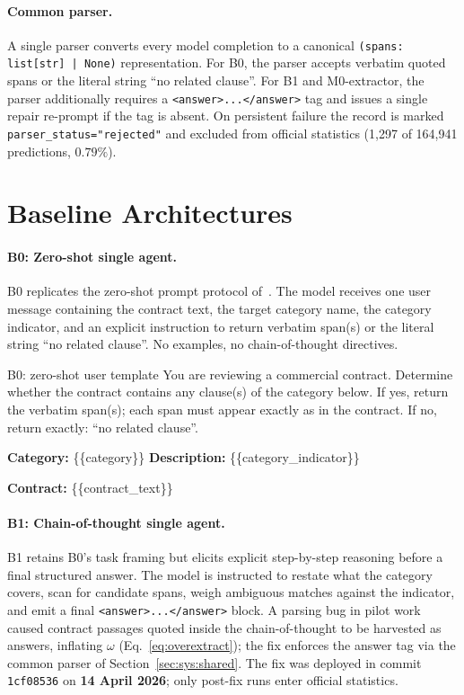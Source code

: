 \paragraph{Common parser.}
A single parser converts every model completion to a canonical
\texttt{(spans: list[str]~|~None)} representation. For B0, the parser accepts
verbatim quoted spans or the literal string ``no related clause''. For B1 and
M0-extractor, the parser additionally requires a \texttt{<answer>...</answer>} tag
and issues a single repair re-prompt if the tag is absent. On persistent failure the
record is marked \texttt{parser\_status="rejected"} and excluded from official
statistics (1{,}297 of 164{,}941 predictions, $0.79\%$).

\section{Baseline Architectures}\label{sec:sys:baselines}

\paragraph{B0: Zero-shot single agent.}
B0 replicates the zero-shot prompt protocol of~\cite{liu2025contracteval}. The model
receives one user message containing the contract text, the target category name, the
category indicator, and an explicit instruction to return verbatim span(s) or the
literal string ``no related clause''. No examples, no chain-of-thought directives.

\begin{promptbox}{B0: zero-shot user template}
You are reviewing a commercial contract. Determine whether the contract contains
any clause(s) of the category below. If yes, return the verbatim span(s); each span
must appear exactly as in the contract. If no, return exactly: ``no related clause''.

\textbf{Category:} \{\{category\}\} \quad
\textbf{Description:} \{\{category\_indicator\}\}

\textbf{Contract:} \{\{contract\_text\}\}
\end{promptbox}

\paragraph{B1: Chain-of-thought single agent.}
B1 retains B0's task framing but elicits explicit step-by-step reasoning before a
final structured answer. The model is instructed to restate what the category covers,
scan for candidate spans, weigh ambiguous matches against the indicator, and emit a
final \texttt{<answer>...</answer>} block. A parsing bug in pilot work caused
contract passages quoted inside the chain-of-thought to be harvested as answers,
inflating $\omega$ (Eq.~\ref{eq:overextract}); the fix enforces the answer tag via
the common parser of Section~\ref{sec:sys:shared}. The fix was deployed in commit
\texttt{1cf08536} on \textbf{14 April 2026}; only post-fix
runs enter official statistics.

